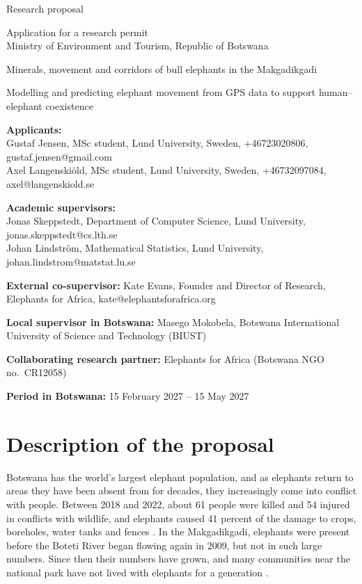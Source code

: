 \documentclass[12pt,a4paper]{article}
\begin{document}
\thispagestyle{empty}
\begin{center}
{\large Research proposal\par}
\vspace{0.6cm}
{\large Application for a research permit\\
Ministry of Environment and Tourism, Republic of Botswana\par}
\vspace{3cm}
{\LARGE Minerals, movement and corridors of bull elephants in the Makgadikgadi\par}
\vspace{0.8cm}
{\large Modelling and predicting elephant movement from GPS data to support human--elephant coexistence\par}
\end{center}
\vfill

\textbf{Applicants:}\\
Gustaf Jensen, MSc student, Lund University, Sweden, +46723020806, gustaf.jensen@gmail.com\\
Axel Langenskiöld, MSc student, Lund University, Sweden, +46732097084, axel@langenskiold.se

\textbf{Academic supervisors:}\\
Jonas Skeppstedt, Department of Computer Science, Lund University, jonas.skeppstedt@cs.lth.se\\
Johan Lindström, Mathematical Statistics, Lund University, johan.lindstrom@matstat.lu.se

\textbf{External co-supervisor:} Kate Evans, Founder and Director of Research, Elephants for Africa, kate@elephantsforafrica.org

\textbf{Local supervisor in Botswana:} Masego Mokobela, Botswana International University of Science and Technology (BIUST)

\textbf{Collaborating research partner:} Elephants for Africa (Botswana NGO no.\ CR12058)

\textbf{Period in Botswana:} 15 February 2027 -- 15 May 2027

\newpage
\setcounter{page}{1}

\section{Description of the proposal}

Botswana has the world's largest elephant population, and as elephants return to areas they have been absent from for decades, they increasingly come into conflict with people. Between 2018 and 2022, about 61 people were killed and 54 injured in conflicts with wildlife, and elephants caused 41 percent of the damage to crops, boreholes, water tanks and fences \cite{atc}. In the Makgadikgadi, elephants were present before the Boteti River began flowing again in 2009, but not in such large numbers. Since then their numbers have grown, and many communities near the national park have not lived with elephants for a generation \cite{evans2019}.
\end{document}
